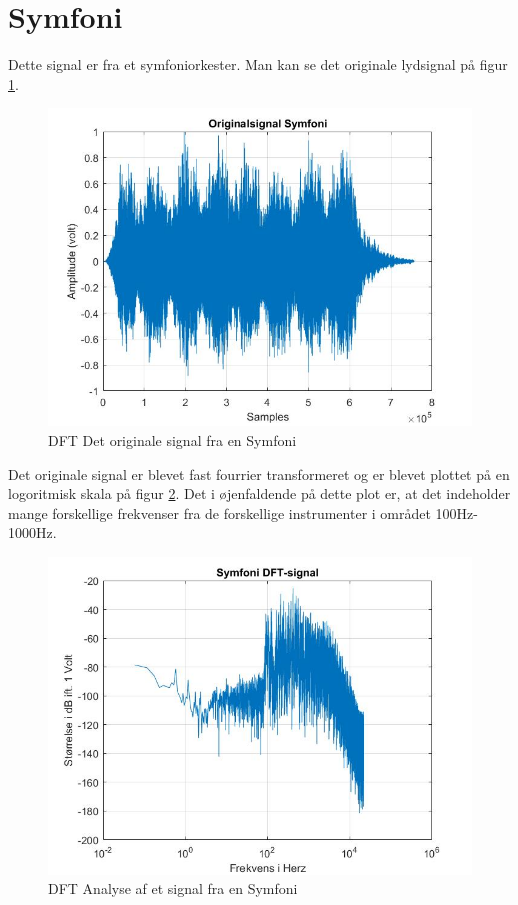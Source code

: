 \section{Symfoni}
Dette signal er fra et symfoniorkester. Man kan se det originale lydsignal på figur \ref{fig:Symfoni original}.
\begin{figure}[H]
	\centering
	\includegraphics[width=140mm]{figures/Symfoni/original.jpg}
	\caption{DFT Det originale signal fra en Symfoni}
	\label{fig:Symfoni original}
\end{figure}

Det originale signal er blevet fast fourrier transformeret og er blevet plottet på en logoritmisk skala på figur \ref{fig:Symfoni DFT}. Det i øjenfaldende på dette plot er, at det indeholder mange forskellige frekvenser fra de forskellige instrumenter i området 100Hz-1000Hz.
\begin{figure}[H]
	\centering
	\includegraphics[width=120mm]{figures/Symfoni/DFT.jpg}
	\caption{DFT Analyse af et signal fra en Symfoni}
	\label{fig:Symfoni DFT}
\end{figure}

